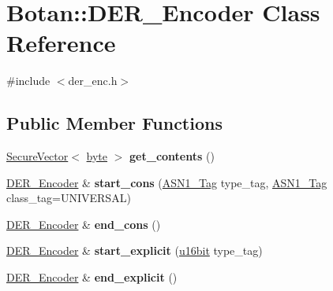 \hypertarget{classBotan_1_1DER__Encoder}{\section{Botan\-:\-:D\-E\-R\-\_\-\-Encoder Class Reference}
\label{classBotan_1_1DER__Encoder}
}


{\ttfamily \#include $<$der\-\_\-enc.\-h$>$}

\subsection*{Public Member Functions}
\begin{DoxyCompactItemize}
\item 
\hypertarget{classBotan_1_1DER__Encoder_acb70c6c95f9a113d9f5b7dbc7b3255cd}{\hyperlink{classBotan_1_1SecureVector}{Secure\-Vector}$<$ \hyperlink{namespaceBotan_a7d793989d801281df48c6b19616b8b84}{byte} $>$ {\bfseries get\-\_\-contents} ()}\label{classBotan_1_1DER__Encoder_acb70c6c95f9a113d9f5b7dbc7b3255cd}

\item 
\hypertarget{classBotan_1_1DER__Encoder_a8696c0c773c1019f1b132f549d05d6db}{\hyperlink{classBotan_1_1DER__Encoder}{D\-E\-R\-\_\-\-Encoder} \& {\bfseries start\-\_\-cons} (\hyperlink{namespaceBotan_aaa08f67a945ef195fa39e62659dffa7a}{A\-S\-N1\-\_\-\-Tag} type\-\_\-tag, \hyperlink{namespaceBotan_aaa08f67a945ef195fa39e62659dffa7a}{A\-S\-N1\-\_\-\-Tag} class\-\_\-tag=U\-N\-I\-V\-E\-R\-S\-A\-L)}\label{classBotan_1_1DER__Encoder_a8696c0c773c1019f1b132f549d05d6db}

\item 
\hypertarget{classBotan_1_1DER__Encoder_ad8a58927cdd86067e2c56fcdcc4a5584}{\hyperlink{classBotan_1_1DER__Encoder}{D\-E\-R\-\_\-\-Encoder} \& {\bfseries end\-\_\-cons} ()}\label{classBotan_1_1DER__Encoder_ad8a58927cdd86067e2c56fcdcc4a5584}

\item 
\hypertarget{classBotan_1_1DER__Encoder_a311b7b920bb3fcf8876e75ea13444f72}{\hyperlink{classBotan_1_1DER__Encoder}{D\-E\-R\-\_\-\-Encoder} \& {\bfseries start\-\_\-explicit} (\hyperlink{namespaceBotan_ab07face63a00c39ea6ed97f203ee501c}{u16bit} type\-\_\-tag)}\label{classBotan_1_1DER__Encoder_a311b7b920bb3fcf8876e75ea13444f72}

\item 
\hypertarget{classBotan_1_1DER__Encoder_a223892e7db741e770900cd50e891d2c9}{\hyperlink{classBotan_1_1DER__Encoder}{D\-E\-R\-\_\-\-Encoder} \& {\bfseries end\-\_\-explicit} ()}\label{classBotan_1_1DER__Encoder_a223892e7db741e770900cd50e891d2c9}


\end{DoxyCompactItemize}
